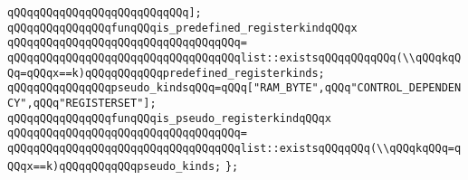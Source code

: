 \verb|qQQqqQQqqQQqqQQqqQQqqQQqqQQq];|\newline
\newline
\verb|qQQqqQQqqQQqqQQqfunqQQqis_predefined_registerkindqQQqx|\newline
\verb|qQQqqQQqqQQqqQQqqQQqqQQqqQQqqQQqqQQq=|\newline
\verb|qQQqqQQqqQQqqQQqqQQqqQQqqQQqqQQqqQQqlist::existsqQQqqQQqqQQq(\\qQQqkqQQq=qQQqx==k)qQQqqQQqqQQqpredefined_registerkinds;|\newline
\newline
\verb|qQQqqQQqqQQqqQQqpseudo_kindsqQQq=qQQq["RAM_BYTE",qQQq"CONTROL_DEPENDENCY",qQQq"REGISTERSET"];|\newline
\newline
\verb|qQQqqQQqqQQqqQQqfunqQQqis_pseudo_registerkindqQQqx|\newline
\verb|qQQqqQQqqQQqqQQqqQQqqQQqqQQqqQQqqQQq=|\newline
\verb|qQQqqQQqqQQqqQQqqQQqqQQqqQQqqQQqqQQqlist::existsqQQqqQQq(\\qQQqkqQQq=qQQqx==k)qQQqqQQqqQQqpseudo_kinds;|\newline
\verb|};|\newline


